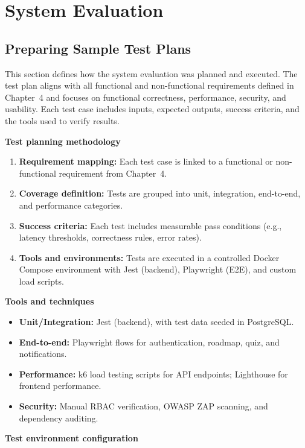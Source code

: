 \chapter{System Evaluation}

\section{Preparing Sample Test Plans}

This section defines how the system evaluation was planned and executed. The test plan aligns with all functional and non-functional requirements defined in Chapter~4 and focuses on functional correctness, performance, security, and usability. Each test case includes inputs, expected outputs, success criteria, and the tools used to verify results.

\textbf{Test planning methodology}

\begin{enumerate}
    \item \textbf{Requirement mapping:} Each test case is linked to a functional or non-functional requirement from Chapter~4.
    \item \textbf{Coverage definition:} Tests are grouped into unit, integration, end-to-end, and performance categories.
    \item \textbf{Success criteria:} Each test includes measurable pass conditions (e.g., latency thresholds, correctness rules, error rates).
    \item \textbf{Tools and environments:} Tests are executed in a controlled Docker Compose environment with Jest (backend), Playwright (E2E), and custom load scripts.
\end{enumerate}

\textbf{Tools and techniques}

\begin{itemize}
    \item \textbf{Unit/Integration:} Jest (backend), with test data seeded in PostgreSQL.
    \item \textbf{End-to-end:} Playwright flows for authentication, roadmap, quiz, and notifications.
    \item \textbf{Performance:} k6 load testing scripts for API endpoints; Lighthouse for frontend performance.
    \item \textbf{Security:} Manual RBAC verification, OWASP ZAP scanning, and dependency auditing.
\end{itemize}

\textbf{Test environment configuration}

